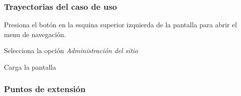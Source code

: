 \clearpage
\subsubsection{Trayectorias del caso de uso}

\begin{UCtrayectoria}%
%
 \Actor Presiona el botón \IUMenu en la esquina superior izquierda de la pantalla 
        para abrir el menu de navegación.

 \Actor Selecciona la opción {\it \IUAdminSitio Administración del sitio}

 \Sistema Carga la pantalla 

\end{UCtrayectoria}


\subsubsection{Puntos de extensión}


